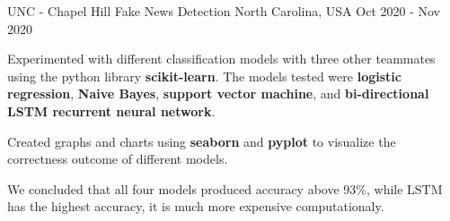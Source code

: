 

\begin{cventries}

  \cventry
    {UNC - Chapel Hill} %
    {Fake News Detection} %
    {North Carolina, USA} %
    {Oct 2020 - Nov 2020} %
    {
      \begin{cvitems} %
        \item {Experimented with different classification models with three other teammates using the python library \textbf{scikit-learn}. The models tested were \textbf{logistic regression}, \textbf{Naive Bayes}, \textbf{support vector machine}, and \textbf{bi-directional LSTM recurrent neural network}.}
        \item {Created graphs and charts using \textbf{seaborn} and \textbf{pyplot} to visualize the correctness outcome of different models.}
        \item {We concluded that all four models produced accuracy above 93\%, while LSTM has the highest accuracy, it is much more expensive computationaly.}
      \end{cvitems}
    }


\end{cventries}
